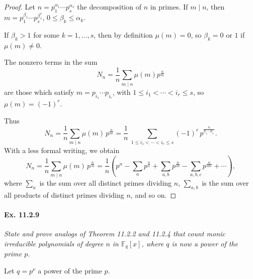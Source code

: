 \documentclass[11pt,a4paper]{article}
\newcommand{\F}{\mathbb{F}}
\begin{document}
\begin{proof}
Let $n = p_1^{\alpha_1}\cdots p_s^{\alpha_s}$ the decomposition of $n$ in primes.
If $m\mid n$, then $m = p_1^{\beta_1}\cdots p_s^{\beta_s^s}$, $0\leq \beta_k \leq \alpha_k$.

If $\beta_k>1$ for some $k=1,\ldots,s$, then by definition $\mu(m)=0$, so $\beta_k = 0$ or $1$ if $\mu(m) \neq 0$.

The nonzero terms in the sum $$N_n = \frac{1}{n} \sum_{m\mid n} \mu(m) p^{\frac{n}{m}}$$ are those which satisfy $m = p_{i_1}\cdots p_{i_r}$, with $1\leq i_1<\cdots < i_r \leq s$, so $\mu(m) = (-1)^r$.

Thus
$$N_n = \frac{1}{n} \sum_{m\mid n} \mu(m)\,  p^{\frac{n}{m}} =  \frac{1}{n} \ \sum_{1\leq i_1<\cdots < i_r \leq s} (-1)^r\,  p^{\frac{n}{p_{i_1}\cdots p_{i_r}}}.$$
With a less formal writing, we obtain
$$N_n = \frac{1}{n} \sum_{m\mid n} \mu(m)\,  p^{\frac{n}{m}} = \frac{1}{n}\left(p^n - \sum_{a} p^{\frac{n}{a}} + \sum_{a,b} p^{\frac{n}{ab}} - \sum_{a,b,c} p^{\frac{n}{abc}}+\cdots \right),$$
where $\sum_a$ is the sum over all distinct primes dividing $n$, $\sum_{a,b}$ is the sum over all products of distinct primes dividing $n$, and so on.
\end{proof}

\paragraph{Ex. 11.2.9}

{\it State and prove analogs of Theorem 11.2.2 and 11.2.4 that count monic irreducible polynomials of degree $n$ in $\F_q[x]$, where $q$ is now a power of the prime $p$.
}

\bigskip

Let $q=p^{\nu}$ a power of the prime $p$.

\bigskip
\end{document}
